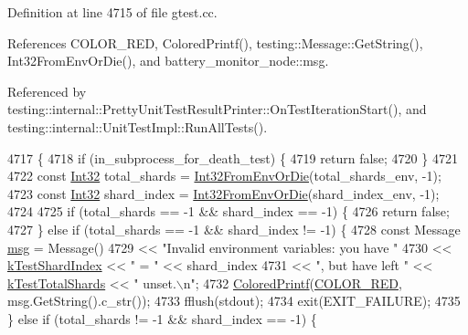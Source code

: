 Definition at line 4715 of file gtest.\+cc.



References C\+O\+L\+O\+R\+\_\+\+R\+ED, Colored\+Printf(), testing\+::\+Message\+::\+Get\+String(), Int32\+From\+Env\+Or\+Die(), and battery\+\_\+monitor\+\_\+node\+::msg.



Referenced by testing\+::internal\+::\+Pretty\+Unit\+Test\+Result\+Printer\+::\+On\+Test\+Iteration\+Start(), and testing\+::internal\+::\+Unit\+Test\+Impl\+::\+Run\+All\+Tests().


\begin{DoxyCode}
4717                                                     \{
4718   \textcolor{keywordflow}{if} (in\_subprocess\_for\_death\_test) \{
4719     \textcolor{keywordflow}{return} \textcolor{keyword}{false};
4720   \}
4721 
4722   \textcolor{keyword}{const} \hyperlink{namespacetesting_1_1internal_a8ee38faaf875f133358abaf9bc056cec}{Int32} total\_shards = \hyperlink{namespacetesting_1_1internal_aaa576613655c2f380278c255c3ec5fef}{Int32FromEnvOrDie}(total\_shards\_env, -1);
4723   \textcolor{keyword}{const} \hyperlink{namespacetesting_1_1internal_a8ee38faaf875f133358abaf9bc056cec}{Int32} shard\_index = \hyperlink{namespacetesting_1_1internal_aaa576613655c2f380278c255c3ec5fef}{Int32FromEnvOrDie}(shard\_index\_env, -1);
4724 
4725   \textcolor{keywordflow}{if} (total\_shards == -1 && shard\_index == -1) \{
4726     \textcolor{keywordflow}{return} \textcolor{keyword}{false};
4727   \} \textcolor{keywordflow}{else} \textcolor{keywordflow}{if} (total\_shards == -1 && shard\_index != -1) \{
4728     \textcolor{keyword}{const} Message \hyperlink{namespacebattery__monitor__node_ab1920c64448816edd4064e494275fdff}{msg} = Message()
4729       << \textcolor{stringliteral}{"Invalid environment variables: you have "}
4730       << \hyperlink{namespacetesting_a5f76dfdb8cb2664da54e320ecaba3643}{kTestShardIndex} << \textcolor{stringliteral}{" = "} << shard\_index
4731       << \textcolor{stringliteral}{", but have left "} << \hyperlink{namespacetesting_a7542311baba200ebabd4065717606f6e}{kTestTotalShards} << \textcolor{stringliteral}{" unset.\(\backslash\)n"};
4732     \hyperlink{namespacetesting_1_1internal_adef3055706176001364e54eb73a87e31}{ColoredPrintf}(\hyperlink{namespacetesting_1_1internal_a648c1bc94c2ef9e868ff3f9dff0f9c4ea9ebb3ddab9391781f6ee5021e1e443c3}{COLOR\_RED}, msg.GetString().c\_str());
4733     fflush(stdout);
4734     exit(EXIT\_FAILURE);
4735   \} \textcolor{keywordflow}{else} \textcolor{keywordflow}{if} (total\_shards != -1 && shard\_index == -1) \{

\end{DoxyCode}
